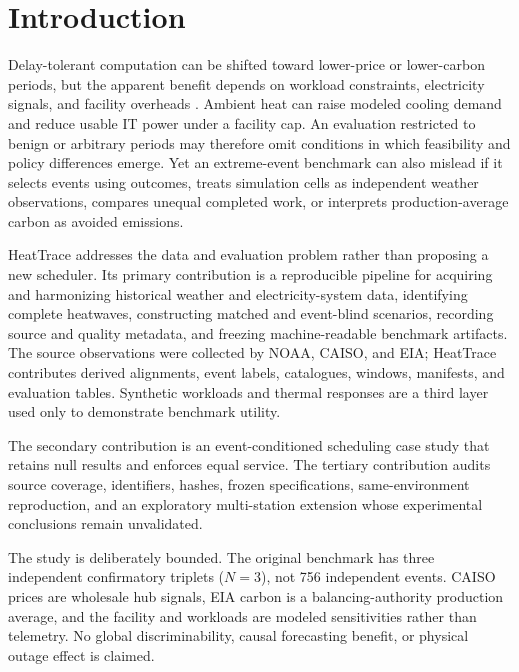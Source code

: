 \documentclass[pdflatex,sn-mathphys-num]{sn-jnl}
\begin{document}
\maketitle

\section{Introduction}\label{sec:intro}

Delay-tolerant computation can be shifted toward lower-price or lower-carbon periods, but the apparent benefit depends on workload constraints, electricity signals, and facility overheads \cite{radovanovic2023carbon,wiesner2021let,hanafy2023carbonscaler}. Ambient heat can raise modeled cooling demand and reduce usable IT power under a facility cap. An evaluation restricted to benign or arbitrary periods may therefore omit conditions in which feasibility and policy differences emerge. Yet an extreme-event benchmark can also mislead if it selects events using outcomes, treats simulation cells as independent weather observations, compares unequal completed work, or interprets production-average carbon as avoided emissions.

HeatTrace addresses the data and evaluation problem rather than proposing a new scheduler. Its primary contribution is a reproducible pipeline for acquiring and harmonizing historical weather and electricity-system data, identifying complete heatwaves, constructing matched and event-blind scenarios, recording source and quality metadata, and freezing machine-readable benchmark artifacts. The source observations were collected by NOAA, CAISO, and EIA; HeatTrace contributes derived alignments, event labels, catalogues, windows, manifests, and evaluation tables. Synthetic workloads and thermal responses are a third layer used only to demonstrate benchmark utility.

The secondary contribution is an event-conditioned scheduling case study that retains null results and enforces equal service. The tertiary contribution audits source coverage, identifiers, hashes, frozen specifications, same-environment reproduction, and an exploratory multi-station extension whose experimental conclusions remain unvalidated.

The study is deliberately bounded. The original benchmark has three independent confirmatory triplets ($N=3$), not 756 independent events. CAISO prices are wholesale hub signals, EIA carbon is a balancing-authority production average, and the facility and workloads are modeled sensitivities rather than telemetry. No global discriminability, causal forecasting benefit, or physical outage effect is claimed.
\end{document}
